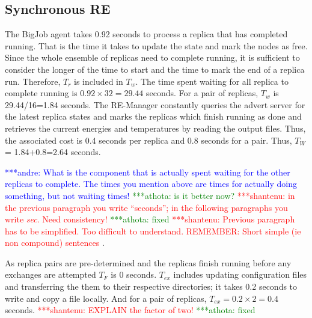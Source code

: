 \documentclass{rspublic}
\newcommand{\jhanote}[1]{ {\textcolor{red} { ***shantenu: #1 }}}
\newcommand{\alnote}[1]{ {\textcolor{blue} { ***andre: #1 }}}
\newcommand{\athotanote}[1]{ {\textcolor{green} { ***athota: #1 }}}
\newcommand{\alnote}[1]{}
\newcommand{\athotanote}[1]{}
\newcommand{\jhanote}[1]{}
\begin{document}
\subsection{Synchronous RE}
\label{sec:impl_sync_re}

The BigJob agent takes 0.92 seconds to process a replica that has
completed running.  That is the time it takes to update the state and
mark the nodes as free.  Since the whole ensemble of replicas need to
complete running, it is sufficient to consider the longer of the time
to start and the time to mark the end of a replica run. Therefore,
$T_r$ is included in $T_w$.  The time spent waiting for all replica to
complete running is $0.92\times32=29.44$ seconds. For a pair of
replicas, $T_w$ is 29.44/16=1.84 seconds.  The RE-Manager constantly
queries the advert server for the latest replica states and marks the
replicas which finish running as done and retrieves the current
energies and temperatures by reading the output files. Thus, the
associated cost is 0.4 seconds per replica and 0.8 seconds for a
pair. Thus, $T_W$ = 1.84+0.8=2.64 seconds.  

\alnote{What is the component that is actually spent waiting for the
  other replicas to complete. The times you mention above are times
  for actually doing something, but not waiting times!} \athotanote{is
  it better now?}  \jhanote{in the previous paragraph you write
  ``seconds''; in the following paragraphs you write {\it sec}. Need
  consistency!} \athotanote{fixed} \jhanote{Previous paragraph has to be simplified.  Too
  difficult to understand. REMEMBER: Short simple (ie non compound)
  sentences}.

As replica pairs are pre-determined and the replicas finish running
before any exchanges are attempted $T _F$ is 0 seconds.  $T_{ex}$
includes updating configuration files and transferring the them to
their respective directories; it takes 0.2 seconds to write and copy a
file locally. And for a pair of replicas, $T_{ex} = 0.2 \times 2=0.4$ seconds. \jhanote{EXPLAIN
  the factor of two!} \athotanote{fixed}
\end{document}
